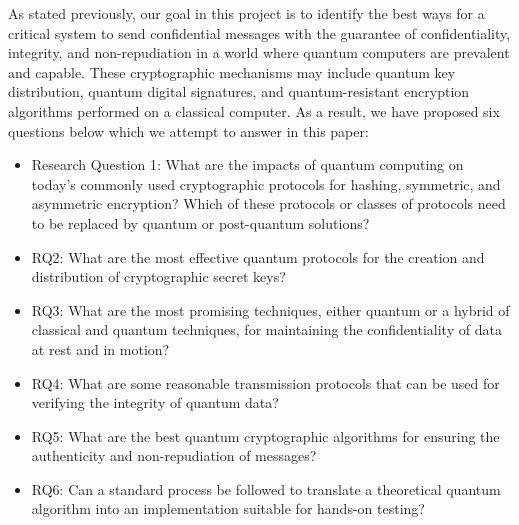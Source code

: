 \documentclass[sigconf]{acmart}
\begin{document}
As stated previously, our goal in this project is to identify the best ways for a critical system to send confidential messages with the guarantee of confidentiality, integrity, and non-repudiation in a world where quantum computers are prevalent and capable. These cryptographic mechanisms may include quantum key distribution, quantum digital signatures, and quantum-resistant encryption algorithms performed on a classical computer. As a result, we have proposed six questions below which we attempt to answer in this paper:
\begin{itemize}
\item Research Question 1: What are the impacts of quantum computing on today's commonly used cryptographic protocols for hashing, symmetric, and asymmetric encryption? Which of these protocols or classes of protocols need to be replaced by quantum or post-quantum solutions?
\item RQ2: What are the most effective quantum protocols for the creation and distribution of cryptographic secret keys?
\item RQ3: What are the most promising techniques, either quantum or a hybrid of classical and quantum techniques, for maintaining the confidentiality of data at rest and in motion?
\item RQ4: What are some reasonable transmission protocols that can be used for verifying the integrity of quantum data?
\item RQ5: What are the best quantum cryptographic algorithms for ensuring the authenticity and non-repudiation of messages?
\item RQ6: Can a standard process be followed to translate a theoretical quantum algorithm into an implementation suitable for hands-on testing?
\end{itemize}

\end{document}
